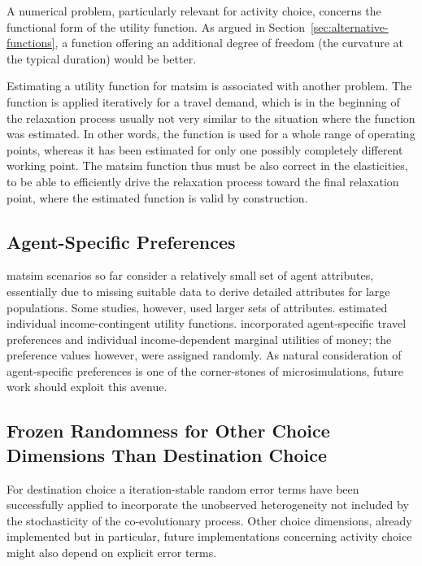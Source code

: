 A numerical problem, particularly relevant for activity choice, concerns the functional form of the utility function. As argued in Section~\ref{sec:alternative-functions}, a function offering an additional degree of freedom (the curvature at the typical duration) would be better.

Estimating a utility function for \gls{matsim} is associated with another problem. The function is applied iteratively for a travel demand, which is in the beginning of the relaxation process usually not very similar to the situation where the function was estimated. In other words, the function is used for a whole range of operating points, whereas it has been estimated for only one possibly completely different working point. The \gls{matsim} function thus must be also correct in the elasticities, to be able to efficiently drive the relaxation process toward the final relaxation point, where the estimated function is valid by construction. 

\subsection{Agent-Specific Preferences}
\label{sec:agent-specific-prefs}
\gls{matsim} scenarios so far consider a relatively small set of agent attributes, essentially due to missing suitable data to derive detailed attributes for large populations. Some studies, however, used larger sets of attributes. \citet{GretherEtAl2010TrbIncomeInTRR, KickhoeferEtAl2011PolicyEvaluationIncome} estimated individual income-contingent utility functions. \citet[][]{HorniEtAl_TechRep_IVT_2012_a, HorniAxhausen_TechRep_IVT_2014} incorporated agent-specific travel preferences and individual income-dependent marginal utilities of money; the preference values however, were assigned randomly. As natural consideration of agent-specific preferences is one of the corner-stones of \glspl{microsimulation}, future work should exploit this avenue. 


\subsection{Frozen Randomness for Other Choice Dimensions Than Destination Choice}
For destination choice a iteration-stable random error terms have been successfully applied to incorporate the unobserved heterogeneity not included by the stochasticity of the co-evolutionary process. Other choice dimensions, already implemented but in particular, future implementations concerning activity choice might also depend on explicit error terms.  

